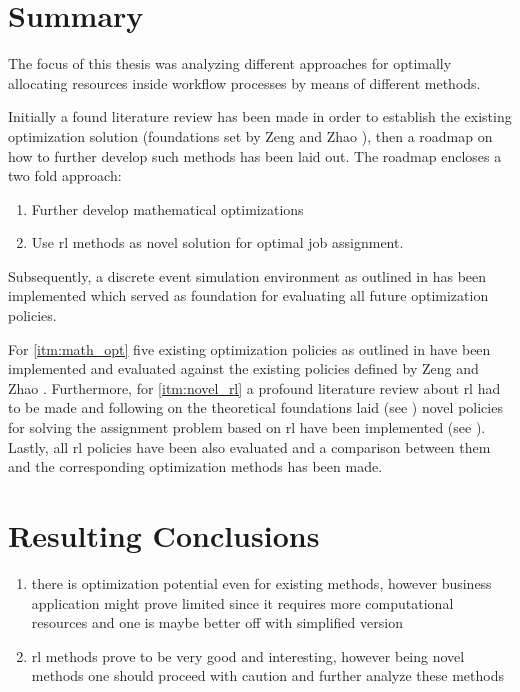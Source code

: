 \documentclass{seal_thesis}
\begin{document}
\section{Summary}

The focus of this thesis was analyzing different approaches for optimally allocating resources inside workflow processes by means of different methods.

Initially a found literature review has been made in order to establish the existing optimization solution (\ie foundations set by Zeng and Zhao \cite{Zeng2005}), then a roadmap on how to further develop such methods has been laid out. The roadmap encloses a two fold approach:

\begin{enumerate}[label=\textbf{Appr. \arabic*},ref=Approach \arabic*]
 	\item Further develop mathematical optimizations \label{itm:math_opt}
 	\item Use \gls{rl} methods as novel solution for optimal job assignment. \label{itm:novel_rl}
 \end{enumerate} 

Subsequently, a discrete event simulation environment as outlined in  has been implemented which served as foundation for evaluating all future optimization policies.

For \ref{itm:math_opt} five existing optimization policies as outlined in  have been implemented and evaluated against the existing policies defined by Zeng and Zhao \cite[pp. 13-14]{Zeng2005}. Furthermore, for \ref{itm:novel_rl} a profound literature review about \gls{rl} had to be made and following on the theoretical foundations laid (see ) novel policies for solving the assignment problem based on \gls{rl} have been implemented (see ). Lastly, all \gls{rl} policies have been also evaluated and a comparison between them and the corresponding optimization methods has been made.

\section{Resulting Conclusions}

\begin{enumerate}
	\item there is optimization potential even for existing methods, however business application might prove limited since it requires more computational resources and one is maybe better off with simplified version
	\item \gls{rl} methods prove to be very good and interesting, however being novel methods one should proceed with caution and further analyze these methods
\end{enumerate}
\end{document}
